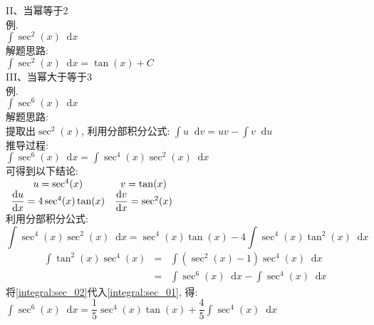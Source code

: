 \documentclass[UTF8, fontset=ubuntu, fleqn, fleqn]{ctexart}
\newcommand*{\dif}{\mathop{}\!\mathrm{d}}
\begin{document}
II、当幂等于2\\
例.\\
$\int\sec^2(x)\dif x$\\
解题思路:\\
$\int\sec^2(x)\dif x=\tan(x)+C$\\[2ex]

III、当幂大于等于3\\
例.\\
$\int\sec^6(x)\dif x$\\
解题思路:\\
提取出$\sec^2(x)$, 利用分部积分公式: $\int u\dif v=uv-\int v\dif u$\\
推导过程:\\
$\int\sec^6(x)\dif x=\int\sec^4(x)\sec^2(x)\dif x$\\
可得到以下结论:\\
$\begin{array}{c c}
u=\sec^4(x) & v=\tan(x)\\
\dfrac{\dif u}{\dif x}=4\sec^4(x)\tan(x) & \dfrac{\dif v}{\dif x}=\sec^2(x)
\end{array}$\\
利用分部积分公式:\\
\begin{equation}
\int\sec^4(x)\sec^2(x)\dif x=\sec^4(x)\tan(x)-4\int\sec^4(x)\tan^2(x)\dif x\label{integral:sec_01}
\end{equation}
\begin{eqnarray}
\int\tan^2(x)\sec^4(x) & = & \int(\sec^2(x)-1)\sec^4(x)\dif x\nonumber\\
& = & \int\sec^6(x)\dif x-\int\sec^4(x)\dif x\label{integral:sec_02}
\end{eqnarray}
将\eqref{integral:sec_02}代入\eqref{integral:sec_01}, 得:\\
$\int\sec^6(x)\dif x=\dfrac{1}{5}\sec^4(x)\tan(x)+\dfrac{4}{5}\int\sec^4(x)\dif x$\\
\end{document}
